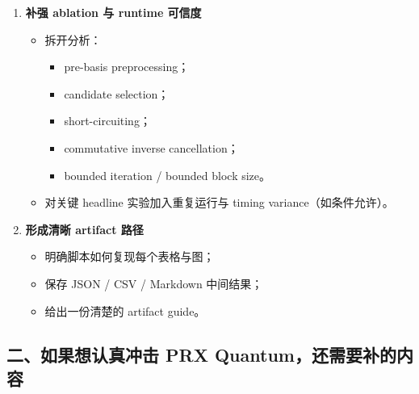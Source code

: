 \documentclass[11pt]{article}
\begin{document}
\begin{enumerate}
    \item \textbf{补强 ablation 与 runtime 可信度}
    \begin{itemize}
        \item 拆开分析：
        \begin{itemize}
            \item pre-basis preprocessing；
            \item candidate selection；
            \item short-circuiting；
            \item commutative inverse cancellation；
            \item bounded iteration / bounded block size。
        \end{itemize}
        \item 对关键 headline 实验加入重复运行与 timing variance（如条件允许）。
    \end{itemize}

    \item \textbf{形成清晰 artifact 路径}
    \begin{itemize}
        \item 明确脚本如何复现每个表格与图；
        \item 保存 JSON / CSV / Markdown 中间结果；
        \item 给出一份清楚的 artifact guide。
    \end{itemize}
\end{enumerate}

\subsection{二、如果想认真冲击 PRX Quantum，还需要补的内容}
\end{document}
